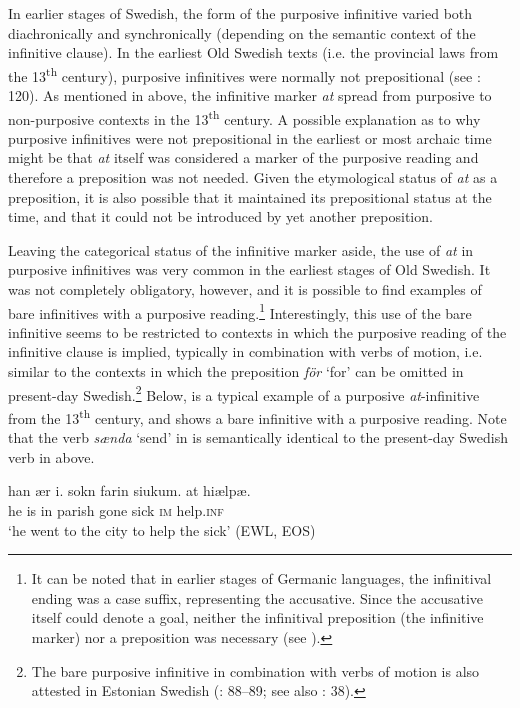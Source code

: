 \documentclass[output=paper]{langscibook}
\begin{document}
In earlier stages of Swedish, the form of the purposive infinitive varied both diachronically and synchronically (depending on the semantic context of the infinitive clause). In the earliest Old Swedish texts (i.e. the provincial laws from the 13\textsuperscript{th} century), purposive infinitives were normally not prepositional (see \citealt{Kalm2016Satsekvivalenta}: 120). As mentioned in  above, the infinitive marker \textit{at} spread from purposive to non-purposive contexts in the 13\textsuperscript{th} century. A possible explanation as to why purposive infinitives were not prepositional in the earliest or most archaic time might be that \textit{at} itself was considered a marker of the purposive reading and therefore a preposition was not needed. Given the etymological status of \textit{at} as a preposition, it is also possible that it maintained its prepositional status at the time, and that it could not be introduced by yet another preposition. 



Leaving the categorical status of the infinitive marker aside, the use of \textit{at} in purposive infinitives was very common in the earliest stages of Old Swedish. It was not completely obligatory, however, and it is possible to find examples of bare infinitives with a purposive reading.\footnote{It can be noted that in earlier stages of Germanic languages, the infinitival ending was a case suffix, representing the accusative. Since the accusative itself could denote a goal, neither the infinitival preposition (the infinitive marker) nor a preposition was necessary (see \citealt{Haspelmath1989,Jeffers1975}).} Interestingly, this use of the bare infinitive seems to be restricted to contexts in which the purposive reading of the infinitive clause is implied, typically in combination with verbs of motion, i.e. similar to the contexts in which the preposition \textit{för} ‘for’ can be omitted in present-day Swedish.\footnote{The bare purposive infinitive in combination with verbs of motion is also attested in Estonian Swedish (\citealt{Lagman1958}: 88–89; see also \citealt{Jorgensen1970}: 38).}  Below,  is a typical example of a purposive \textit{at}-infinitive from the 13\textsuperscript{th} century, and  shows a bare infinitive with a purposive reading. Note that the verb \textit{sænda} ‘send’ in  is semantically identical to the present-day Swedish verb in  above.\largerpage

\ea
\label{ex:kalm:9}
\ea \label{ex:kalm:9a}
\gll han ær i. sokn farin siukum. at hiælpæ.\\
 he is in parish gone sick \textsc{im} help.\textsc{inf}\\ 
\glt ‘he went to the city to help the sick’ (EWL, EOS)
\end{document}
